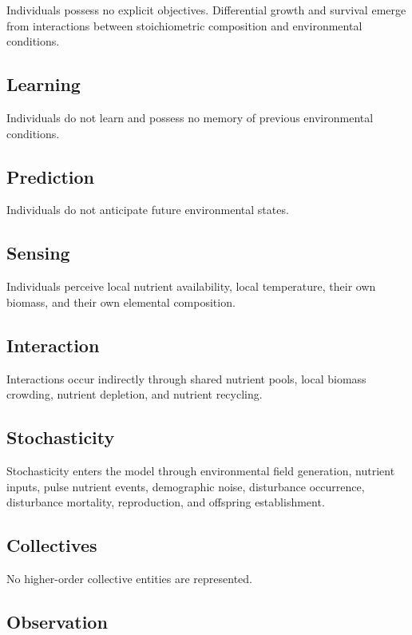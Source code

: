 Individuals possess no explicit objectives. Differential growth and survival emerge from interactions between stoichiometric composition and environmental conditions.

\subsection{Learning}

Individuals do not learn and possess no memory of previous environmental conditions.

\subsection{Prediction}

Individuals do not anticipate future environmental states.

\subsection{Sensing}

Individuals perceive local nutrient availability, local temperature, their own biomass, and their own elemental composition.

\subsection{Interaction}

Interactions occur indirectly through shared nutrient pools, local biomass crowding, nutrient depletion, and nutrient recycling.

\subsection{Stochasticity}

Stochasticity enters the model through environmental field generation, nutrient inputs, pulse nutrient events, demographic noise, disturbance occurrence, disturbance mortality, reproduction, and offspring establishment.

\subsection{Collectives}

No higher-order collective entities are represented.

\subsection{Observation}

